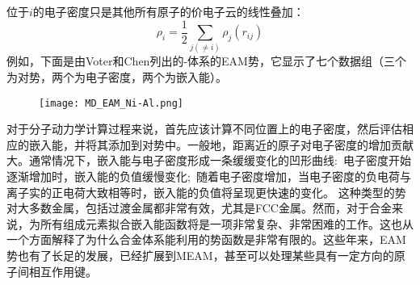 位于$i$的电子密度只是其他所有原子的价电子云的线性叠加：
\begin{equation}
	\rho_i=\dfrac12\sum_{j(\neq i)}\rho_j(r_{ij})
	\label{eq:EAM_rho}
\end{equation}
例如，下面是由\textrm{Voter}和\textrm{Chen}\cite{MRSSP82-175_1987}列出的-体系的\textrm{EAM}势，它显示了七个数据组（三个为对势，两个为电子密度，两个为嵌入能）。
\begin{figure}[h!]
\centering
\vspace*{-0.1in}
\texttt{[image: MD\_EAM\_Ni-Al.png]}
\caption{\fontsize{7.2pt}{4.2pt}}%
\label{EAM_Ni-Al}
\end{figure}
对于分子动力学计算过程来说，首先应该计算不同位置上的电子密度，然后评估相应的嵌入能，并将其添加到对势中。一般地，距离近的原子对电子密度的增加贡献大。通常情况下，嵌入能与电子密度形成一条缓缓变化的凹形曲线:~电子密度开始逐渐增加时，嵌入能的负值缓慢变化;~随着电子密度增加，当电子密度的负电荷与离子实的正电荷大致相等时，嵌入能的负值将呈现更快速的变化。
这种类型的势对大多数金属，包括过渡金属都非常有效，尤其是\textrm{FCC}金属。然而，对于合金来说，为所有组成元素拟合嵌入能函数将是一项非常复杂、非常困难的工作。这也从一个方面解释了为什么合金体系能利用的势函数是非常有限的。这些年来，\textrm{EAM}势也有了长足的发展，已经扩展到\textrm{MEAM}，甚至可以处理某些具有一定方向的原子间相互作用键\cite{PRB46-2727_1992}。
